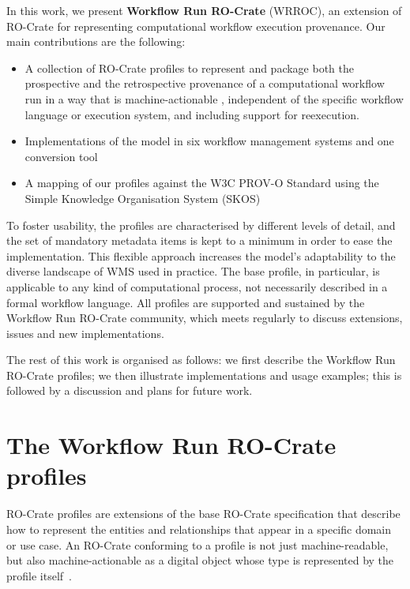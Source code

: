 \documentclass[10pt,letterpaper]{article}
\begin{document}
In this work, we present \textbf{Workflow Run RO-Crate} (WRROC), an extension of RO-Crate for representing computational workflow execution provenance.
Our main contributions are the following:

\begin{itemize}
\item   A collection of RO-Crate profiles to represent and package both the prospective and the retrospective provenance of a computational workflow run in a way that is machine-actionable \cite{Batista 2022},  independent of the specific workflow language or execution system, and including support for reexecution.
\item   Implementations of the model in six workflow management systems and one conversion tool
\item   A mapping of our profiles against the W3C PROV-O Standard using the Simple Knowledge Organisation System (SKOS) \cite{Isaac 2009}
\end{itemize}

To foster usability, the profiles are characterised by different levels of detail, and the set of mandatory metadata items is kept to a minimum in order to ease the implementation.
This flexible approach increases the model's adaptability to the diverse landscape of WMS used in practice.
The base profile, in particular, is applicable to any kind of computational process, not necessarily described in a formal workflow language.
All profiles are supported and sustained by the Workflow Run RO-Crate community, which meets regularly to discuss extensions, issues and new implementations.

The rest of this work is organised as follows: we first describe the Workflow Run RO-Crate profiles; we then illustrate implementations and usage examples; this is followed by a discussion and plans for future work.


\section{The Workflow Run RO-Crate profiles}\label{the-workflow-run-ro-crate-profiles}

RO-Crate profiles are extensions of the base RO-Crate specification that describe how to represent the entities and relationships that appear in a specific domain or use case.
An RO-Crate conforming to a profile is not just machine-readable, but also machine-actionable as a digital object whose type is represented by the profile itself~\cite{Soiland-Reyes 2022b}.
\end{document}
